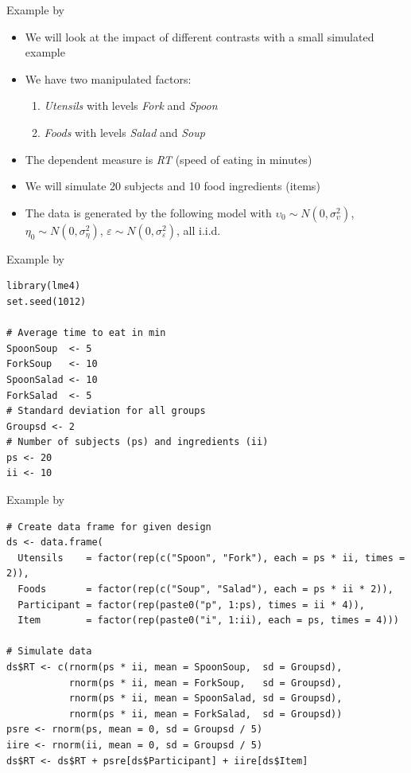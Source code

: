 \documentclass[aspectratio=169]{beamer}
\begin{document}
\begin{frame}[<+->]{Example by \citet{Brehm2022}}
  \begin{itemize}
    \item We will look at the impact of different contrasts with a small
      simulated example
    \item We have two manipulated factors:
      \begin{enumerate}
        \item \emph{Utensils} with levels \emph{Fork} and \emph{Spoon}
        \item \emph{Foods} with levels \emph{Salad} and \emph{Soup}
      \end{enumerate}
    \item The dependent measure is \emph{RT} (speed of eating in minutes)
    \item We will simulate 20 subjects and 10 food ingredients (items)
    \item The data is generated by the following model
      with $\upsilon_0 \sim N(0, \sigma_{\upsilon}^2)$, $\eta_0 \sim N(0,
      \sigma_{\eta}^2)$, $\varepsilon \sim N(0, \sigma_{\varepsilon}^2)$, all
      i.i.d.
  \end{itemize}
\end{frame}

\begin{frame}[fragile]{Example by \citet{Brehm2022}}
\begin{lstlisting}
library(lme4)
set.seed(1012)

# Average time to eat in min
SpoonSoup  <- 5
ForkSoup   <- 10
SpoonSalad <- 10
ForkSalad  <- 5
# Standard deviation for all groups
Groupsd <- 2
# Number of subjects (ps) and ingredients (ii)
ps <- 20
ii <- 10
\end{lstlisting}
\end{frame}

\begin{frame}[fragile]{Example by \citet{Brehm2022}}
  \small
\begin{lstlisting}
# Create data frame for given design
ds <- data.frame(
  Utensils    = factor(rep(c("Spoon", "Fork"), each = ps * ii, times = 2)),
  Foods       = factor(rep(c("Soup", "Salad"), each = ps * ii * 2)),
  Participant = factor(rep(paste0("p", 1:ps), times = ii * 4)),
  Item        = factor(rep(paste0("i", 1:ii), each = ps, times = 4)))

# Simulate data
ds$RT <- c(rnorm(ps * ii, mean = SpoonSoup,  sd = Groupsd),
           rnorm(ps * ii, mean = ForkSoup,   sd = Groupsd),
           rnorm(ps * ii, mean = SpoonSalad, sd = Groupsd),
           rnorm(ps * ii, mean = ForkSalad,  sd = Groupsd))
psre <- rnorm(ps, mean = 0, sd = Groupsd / 5)
iire <- rnorm(ii, mean = 0, sd = Groupsd / 5)
ds$RT <- ds$RT + psre[ds$Participant] + iire[ds$Item]
\end{lstlisting}
\end{frame}
\end{document}
